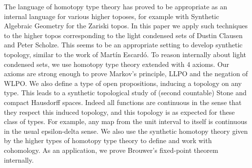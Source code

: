 The language of homotopy type theory has proved to be appropriate as an internal language for various higher toposes, 
for example with Synthetic Algebraic Geometry for the Zariski topos.
In this paper we apply such techniques to the higher topos corresponding to the light condensed sets 
of Dustin Clausen and Peter Scholze.
This seems to be an appropriate setting to develop synthetic topology, similar to the work of 
Martín Escardó.
To reason internally about light condensed sets, we use homotopy type theory extended with 4 axioms.
Our axioms are strong enough to prove Markov's principle, LLPO and the negation of WLPO. 
We also define a type of open propositions, inducing a topology on any type. 
This leads to a synthetic topological study of (second countable)
Stone and compact Hausdorff spaces. 
Indeed all functions are continuous in the sense that they respect this induced topology, 
and this topology is as expected for these class of types.
For example, any map from the unit interval to itself is continuous in the usual epsilon-delta sense.
We also use the synthetic homotopy theory 
given by the higher types of homotopy type theory to define and 
work with cohomology.
As an application, we prove Brouwer's fixed-point theorem
internally. 
